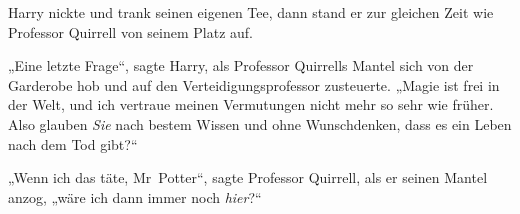 Harry nickte und trank seinen eigenen Tee, dann stand er zur gleichen Zeit wie Professor Quirrell von seinem Platz auf.

„Eine letzte Frage“, sagte Harry, als Professor Quirrells Mantel sich von der Garderobe hob und auf den Verteidigungsprofessor zusteuerte.
„Magie ist frei in der Welt, und ich vertraue meinen Vermutungen nicht mehr so sehr wie früher. Also glauben \emph{Sie} nach bestem Wissen und ohne Wunschdenken, dass es ein Leben nach dem Tod gibt?“

„Wenn ich das täte, Mr~Potter“, sagte Professor Quirrell, als er seinen Mantel anzog, „wäre ich dann immer noch \emph{hier}?“


